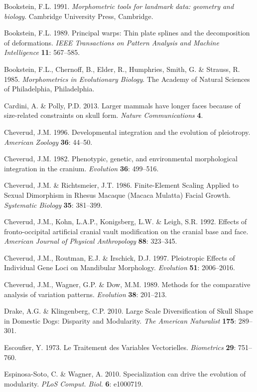 \documentclass[12pt,]{article}
\begin{document}
Bookstein, F.L. 1991. \emph{Morphometric tools for landmark data:
geometry and biology}. Cambridge University Press, Cambridge.

Bookstein, F.L. 1989. Principal warps: Thin plate splines and the
decomposition of deformations. \emph{IEEE Transactions on Pattern
Analysis and Machine Intelligence} \textbf{11}: 567--585.

Bookstein, F.L., Chernoff, B., Elder, R., Humphries, Smith, G. \&
Strauss, R. 1985. \emph{Morphometrics in Evolutionary Biology}. The
Academy of Natural Sciences of Philadelphia, Philadelphia.

Cardini, A. \& Polly, P.D. 2013. Larger mammals have longer faces
because of size-related constraints on skull form. \emph{Nature
Communications} \textbf{4}.

Cheverud, J.M. 1996. Developmental integration and the evolution of
pleiotropy. \emph{American Zoology} \textbf{36}: 44--50.

Cheverud, J.M. 1982. Phenotypic, genetic, and environmental
morphological integration in the cranium. \emph{Evolution} \textbf{36}:
499--516.

Cheverud, J.M. \& Richtsmeier, J.T. 1986. Finite-Element Scaling Applied
to Sexual Dimorphism in Rhesus Macaque (Macaca Mulatta) Facial Growth.
\emph{Systematic Biology} \textbf{35}: 381--399.

Cheverud, J.M., Kohn, L.A.P., Konigsberg, L.W. \& Leigh, S.R. 1992.
Effects of fronto-occipital artificial cranial vault modification on the
cranial base and face. \emph{American Journal of Physical Anthropology}
\textbf{88}: 323--345.

Cheverud, J.M., Routman, E.J. \& Irschick, D.J. 1997. Pleiotropic
Effects of Individual Gene Loci on Mandibular Morphology.
\emph{Evolution} \textbf{51}: 2006--2016.

Cheverud, J.M., Wagner, G.P. \& Dow, M.M. 1989. Methods for the
comparative analysis of variation patterns. \emph{Evolution}
\textbf{38}: 201--213.

Drake, A.G. \& Klingenberg, C.P. 2010. Large Scale Diversification of
Skull Shape in Domestic Dogs: Disparity and Modularity. \emph{The
American Naturalist} \textbf{175}: 289--301.

Escoufier, Y. 1973. Le Traitement des Variables Vectorielles.
\emph{Biometrics} \textbf{29}: 751--760.

Espinosa-Soto, C. \& Wagner, A. 2010. Specialization can drive the
evolution of modularity. \emph{PLoS Comput. Biol.} \textbf{6}: e1000719.
\end{document}
